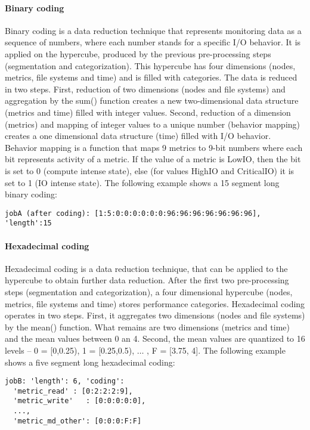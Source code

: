 \documentclass{jhps}
\begin{document}
\paragraph{Binary coding}
Binary coding is a data reduction technique that represents monitoring data as a sequence of numbers, where each number stands for a specific I/O behavior.
It is applied on the hypercube, produced by the previous pre-processing steps (segmentation and categorization).
This hypercube has four dimensions (nodes, metrics, file systems and time) and is filled with categories.
The data is reduced in two steps.
First, reduction of two dimensions (nodes and file systems) and aggregation by the sum() function creates a new two-dimensional data structure (metrics and time) filled with integer values.
Second, reduction of a dimension (metrics) and mapping of integer values to a unique number (behavior mapping) creates a one dimensional data structure (time) filled with I/O behavior.
Behavior mapping is a function that maps 9 metrics to 9-bit numbers where each bit represents activity of a metric.
If the value of a metric is LowIO, then the bit is set to 0 (compute intense state), else (for values HighIO and CriticalIO) it is set to 1 (IO intense state).
The following example shows a 15 segment long binary coding:

\begin{lstlisting}
jobA (after coding): [1:5:0:0:0:0:0:0:96:96:96:96:96:96:96], 'length':15
\end{lstlisting}

\paragraph{Hexadecimal coding}
Hexadecimal coding is a data reduction technique, that can be applied to the hypercube to obtain further data reduction.
After the first two pre-processing steps (segmentation and categorization), a four dimensional hypercube (nodes, metrics, file systems and time) stores performance categories.
Hexadecimal coding operates in two steps.
First, it aggregates two dimensions (nodes and file systems) by the mean() function.
What remains are two dimensions (metrics and time) and the mean values between 0 an 4.
Second, the mean values are quantized to 16 levels -- 0 = [0,0.25), 1 = [0.25,0.5), $ \ldots $ , F = [3.75, 4].
The following example shows a five segment long hexadecimal coding:

\begin{lstlisting}
jobB: 'length': 6, 'coding':
  'metric_read'	: [0:2:2:2:9],
  'metric_write'   : [0:0:0:0:0],
  ...,
  'metric_md_other': [0:0:0:F:F]
\end{lstlisting}
\end{document}
